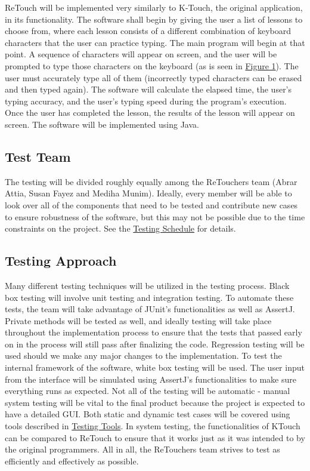 \documentclass[12pt, titlepage]{article}
\begin{document}
	ReTouch will be implemented very similarly to K-Touch, the original application, in its functionality. The software shall begin by giving the user a list of lessons to choose from, where each lesson consists of a different combination of keyboard characters that the user can practice typing. The main program will begin at that point. A sequence of characters will appear on screen, and the user will be prompted to type those characters on the keyboard (as is seen in \hyperref[figure:1]{Figure 1}). The user must accurately type all of them (incorrectly typed characters can be erased and then typed again). The software will calculate the elapsed time, the user's typing accuracy, and the user's typing speed during the program's execution. Once the user has completed the lesson, the results of the lesson will appear on screen. The software will be implemented using Java.

\subsection{Test Team}

	The testing will be divided roughly equally among the ReTouchers team (Abrar Attia, Susan Fayez and Mediha Munim). Ideally, every member will be able to look over all of the components that need to be tested and contribute new cases to ensure robustness of the software, but this may not be possible due to the time constraints on the project. See the \hyperref[sec:ts]{Testing Schedule} for details.

\subsection{Testing Approach}

	Many different testing techniques will be utilized in the testing process. Black box testing will involve unit testing and integration testing. To automate these tests, the team will take advantage of JUnit's functionalities {\color{cyan} as well as AssertJ}. Private methods will be tested as well, and ideally testing will take place throughout the implementation process to ensure that the tests that passed early on in the process will still pass after finalizing the code. {\color{cyan} Regression testing will be used should we make any major changes to the implementation.} To test the internal framework of the software, white box testing will be used.{\color{cyan} The user input from the interface will be simulated using AssertJ's functionalities to make sure everything runs as expected.} Not all of the testing will be automatic - manual system testing will be vital to the final product because the project is expected to have a detailed GUI. Both static and dynamic test cases will be covered using tools described in \hyperref[sec:tt]{Testing Tools}. In system testing, the functionalities of KTouch can be compared to ReTouch to ensure that it works just as it was intended to by the original programmers. All in all, the ReTouchers team strives to test as efficiently and effectively as possible.
\end{document}
